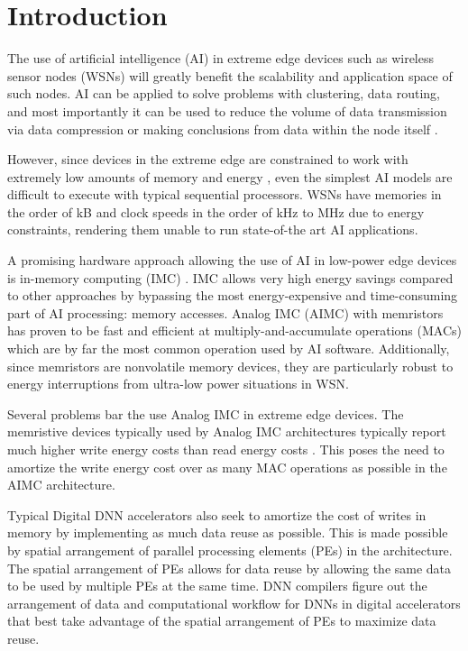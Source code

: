 \chapter{Introduction}

The use of artificial intelligence (AI) in extreme edge devices such as wireless sensor nodes (WSNs) will greatly benefit the scalability and application space of such nodes. AI can be applied to solve problems with clustering, data routing, and most importantly it can be used to reduce the volume of data transmission via data compression or making conclusions from data within the node itself \cite{alsheikh2014machine}.

However, since devices in the extreme edge are constrained to work with extremely low amounts of memory and energy \cite{Ma_2019}, even the simplest AI models are difficult to execute with typical sequential processors. WSNs have memories in the order of kB and clock speeds in the order of kHz to MHz due to energy constraints, rendering them unable to run state-of-the art AI applications.

A promising hardware approach allowing the use of AI in low-power edge devices is in-memory computing (IMC) \cite{Patterson_1997}. IMC allows very high energy savings compared to other approaches by bypassing the most energy-expensive and time-consuming part of AI processing: memory accesses. Analog IMC (AIMC) with memristors has proven to be fast and efficient at multiply-and-accumulate operations (MACs) which are by far the most common operation used by AI software. Additionally, since memristors are nonvolatile memory devices, they are particularly robust to energy interruptions from ultra-low power situations in WSN. 

Several problems bar the use Analog IMC in extreme edge devices. The memristive devices typically used by Analog IMC architectures typically report much higher write energy costs than read energy costs \cite{}. This poses the need to amortize the write energy cost over as many MAC operations as possible in the AIMC architecture.

Typical Digital DNN accelerators also seek to amortize the cost of writes in memory by implementing as much data reuse as possible. This is made possible by spatial arrangement of parallel processing elements (PEs) in the architecture. The spatial arrangement of PEs allows for data reuse by allowing the same data to be used by multiple PEs at the same time. DNN compilers figure out the arrangement of data and computational workflow for DNNs in digital accelerators that best take advantage of the spatial arrangement of PEs to maximize data reuse. 

